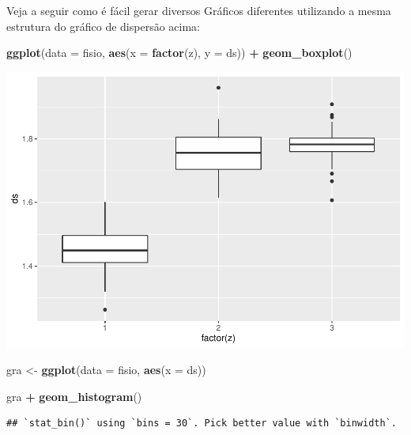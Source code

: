 \documentclass[]{book}
\newenvironment{Shaded}{\begin{snugshade}}{\end{snugshade}}
\newcommand{\DataTypeTok}[1]{\textcolor[rgb]{0.13,0.29,0.53}{#1}}
\newcommand{\KeywordTok}[1]{\textcolor[rgb]{0.13,0.29,0.53}{\textbf{#1}}}
\newcommand{\NormalTok}[1]{#1}
\newcommand{\OperatorTok}[1]{\textcolor[rgb]{0.81,0.36,0.00}{\textbf{#1}}}
\newcommand{\StringTok}[1]{\textcolor[rgb]{0.31,0.60,0.02}{#1}}
\begin{document}
Veja a seguir como é fácil gerar diversos Gráficos diferentes utilizando a mesma estrutura do gráfico de dispersão acima:

\begin{Shaded}
\begin{Highlighting}[]
\KeywordTok{ggplot}\NormalTok{(}\DataTypeTok{data =}\NormalTok{ fisio, }\KeywordTok{aes}\NormalTok{(}\DataTypeTok{x =} \KeywordTok{factor}\NormalTok{(z), }\DataTypeTok{y =}\NormalTok{ ds)) }\OperatorTok{+}
\StringTok{  }\KeywordTok{geom_boxplot}\NormalTok{()}
\end{Highlighting}
\end{Shaded}

\includegraphics{TudodoR_files/figure-latex/unnamed-chunk-190-1.pdf}

\begin{Shaded}
\begin{Highlighting}[]
\NormalTok{gra <-}\StringTok{ }\KeywordTok{ggplot}\NormalTok{(}\DataTypeTok{data =}\NormalTok{ fisio, }\KeywordTok{aes}\NormalTok{(}\DataTypeTok{x =}\NormalTok{ ds)) }
\end{Highlighting}
\end{Shaded}

\begin{Shaded}
\begin{Highlighting}[]
\NormalTok{gra }\OperatorTok{+}\StringTok{  }\KeywordTok{geom_histogram}\NormalTok{()}
\end{Highlighting}
\end{Shaded}

\begin{verbatim}
## `stat_bin()` using `bins = 30`. Pick better value with `binwidth`.
\end{verbatim}
\end{document}
